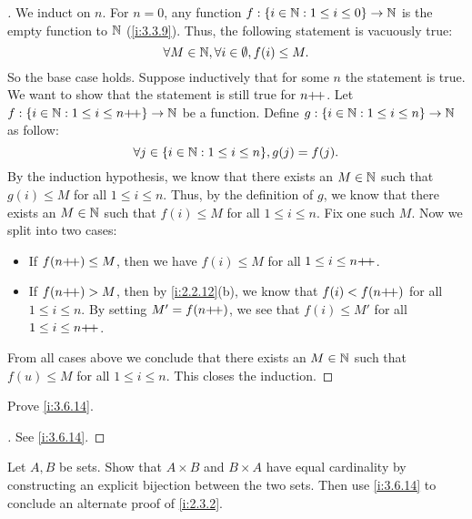 \begin{proof}[]
  We induct on \(n\).
  For \(n = 0\), any function \(f : \left\lbrace i \in \mathbb{N} : 1 \leq i \leq 0\right\rbrace \to \mathbb{N}\) is the empty function to \(\mathbb{N}\) (\cref{i:3.3.9}).
  Thus, the following statement is vacuously true:
  \[
    \forall M \in \mathbb{N}, \forall i \in \emptyset, f(i) \leq M.
  \]
  So the base case holds.
  Suppose inductively that for some \(n\) the statement is true.
  We want to show that the statement is still true for \(n{+}\!{+}\).
  Let \(f : \left\lbrace i \in \mathbb{N} : 1 \leq i \leq n{+}\!{+}\right\rbrace \to \mathbb{N}\) be a function.
  Define \(g : \left\lbrace i \in \mathbb{N} : 1 \leq i \leq n\right\rbrace \to \mathbb{N}\) as follow:
  \[
    \forall j \in \set{i \in \N : 1 \leq i \leq n}, g(j) = f(j).
  \]
  By the induction hypothesis, we know that there exists an \(M \in \mathbb{N}\) such that \(g(i) \leq M\) for all \(1 \leq i \leq n\).
  Thus, by the definition of \(g\), we know that there exists an \(M \in \mathbb{N}\) such that \(f(i) \leq M\) for all \(1 \leq i \leq n\).
  Fix one such \(M\).
  Now we split into two cases:
  \begin{itemize}
    \item If \(f(n{+}\!{+}) \leq M\), then we have \(f(i) \leq M\) for all \(1 \leq i \leq n{+}\!{+}\).
    \item If \(f(n{+}\!{+}) > M\), then by \cref{i:2.2.12}(b), we know that \(f(i) < f(n{+}\!{+})\) for all \(1 \leq i \leq n\).
          By setting \(M' = f(n{+}\!{+})\), we see that \(f(i) \leq M'\) for all \(1 \leq i \leq n{+}\!{+}\).
  \end{itemize}
  From all cases above we conclude that there exists an \(M \in \mathbb{N}\) such that \(f(u) \leq M\) for all \(1 \leq i \leq n\).
  This closes the induction.
\end{proof}

\begin{ex}\label{i:ex:3.6.4}
  Prove \cref{i:3.6.14}.
\end{ex}

\begin{proof}[]
  See \cref{i:3.6.14}.
\end{proof}

\begin{ex}\label{i:ex:3.6.5}
  Let \(A, B\) be sets.
  Show that \(A \times B\) and \(B \times A\) have equal cardinality by constructing an explicit bijection between the two sets.
  Then use \cref{i:3.6.14} to conclude an alternate proof of \cref{i:2.3.2}.
\end{ex}

